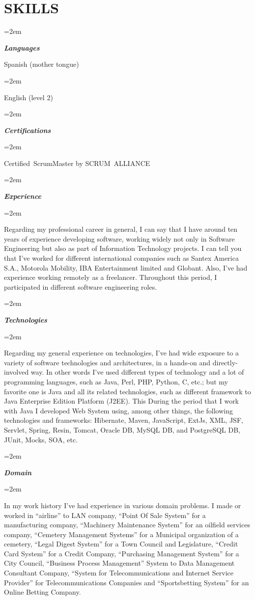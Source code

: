 \documentclass[paper=a4,fontsize=11pt]{scrartcl} %
\newlength{\spacebox}
\newcommand{\sepspace}{\vspace*{1em}}		%
\newcommand{\NewPart}[1]{\section*{\uppercase{#1}}}
\newcommand{\PersonalEntry}[2]{
		\noindent\hangindent=2em\hangafter=0 %
		\parbox{\spacebox}{        %
		\textit{#1}}		       %
		\hspace{1.5em} #2 \par}    %
\newcommand{\SkillsEntry}[2]{      %
		\noindent\hangindent=2em\hangafter=0 %
		\parbox{\spacebox}{        %
		\textit{#1}}			   %
		\hspace{1.5em} #2 \par}    %
\begin{document}
\NewPart{Skills}{}

\SkillsEntry{\large{\textbf{Languages}}}{Spanish (mother tongue)}

\SkillsEntry{}{English (level 2)}

\sepspace

\SkillsEntry{\large{\textbf{Certifications}}}{}
\SkillsEntry{}{
Certified ScrumMaster by SCRUM ALLIANCE
}

\sepspace

\SkillsEntry{\large{\textbf{Experience}}}{}
\SkillsEntry{}{
Regarding my professional career in general, I can say that I have around ten years of experience developing software, working widely not only in Software Engineering but also as part of Information Technology projects. I can tell you that I've worked for different international companies such as Santex America S.A., Motorola Mobility, IBA Entertainment limited and Globant. Also, I've had experience working remotely as a freelancer. Throughout this period, I participated in different software engineering roles. 
}

\sepspace

\SkillsEntry{\large{\textbf{Technologies}}}{}
\SkillsEntry{}{
Regarding my general experience on technologies, I've had wide exposure to a variety of software technologies and architectures, in a hands-on and directly-involved way. In other words I've used different types of technology and a lot of programming languages, such as Java, Perl, PHP, Python, C, etc.; but my favorite one is Java and all its related technologies, such as different framework to Java Enterprise Edition Platform (J2EE). This During the period that I work with Java I developed Web System using, among other things, the following technologies and frameworks: Hibernate, Maven, JavaScript, ExtJs, XML, JSF, Servlet, Spring, Resin, Tomcat, Oracle DB, MySQL DB, and PostgreSQL DB, JUnit, Mocks, SOA, etc.
}

\sepspace

\SkillsEntry{\large{\textbf{Domain}}}{}
\SkillsEntry{}{
	In my work history I've had experience in various domain problems. I made or worked in “airline” to LAN company, “Point Of Sale System” for a manufacturing company, “Machinery Maintenance System” for an oilfield services company, “Cemetery Management Systems” for a Municipal organization of a cemetery, “Legal Digest System” for a Town Council and Legislature, “Credit Card System” for a Credit Company, “Purchasing Management System” for a City Council,  “Business Process Management” System to Data Management Consultant Company, “System for Telecommunications and Internet Service Provider” for Telecommunications Companies and “Sportsbetting System” for an Online Betting Company.
}
\end{document}
